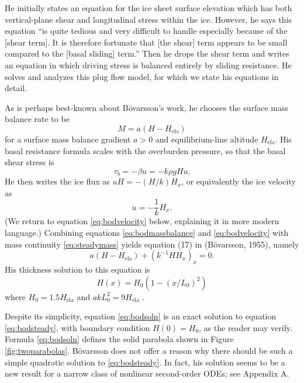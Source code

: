 \documentclass[twocolumn]{igs}
\renewcommand{\dh}{\fontencoding{T1}\selectfont{\symbol{240}}}
\newcommand{\bod}{B\"o\dh varsson\xspace}
\newcommand{\citepbod}{(B\"o\dh varsson, 1955)\nocite{Bodvardsson}\xspace}
\newcommand{\Hela}{H_{\text{ela}}}
\begin{document}
He initially states an equation for the ice sheet surface elevation which has both vertical-plane shear and longitudinal stress within the ice.  However, he says this equation ``is quite tedious and very difficult to handle especially because of the [shear term].  It is therefore fortunate that [the shear] term appears to be small compared to the [basal sliding] term.''  Then he drops the shear term and writes an equation in which driving stress is balanced entirely by sliding resistance.  He solves and analyzes this plug flow model, for which we state his equations in detail.

As is perhaps best-known about \bod's work, he chooses the surface mass balance rate to be
\begin{equation}
M = a (H - \Hela)  \label{eq:bodmassbalance}
\end{equation}
for a surface mass balance gradient $a>0$ and equilibrium-line altitude $\Hela$.  His basal resistance formula scales with the overburden pressure, so that the basal shear stress is
\begin{equation}
\tau_b = - \beta u = - k \rho g H u.  \label{eq:bodstresschoice}
\end{equation}
He then writes the ice flux as $uH=-(H/k) H_x$, or equivalently the ice velocity as
\begin{equation}
u = - \frac{1}{k} H_x. \label{eq:bodvelocity}
\end{equation}
(We return to equation \eqref{eq:bodvelocity} below, explaining it in more modern language.)  Combining equations \eqref{eq:bodmassbalance} and \eqref{eq:bodvelocity} with mass continuity \eqref{eq:steadymass} yields equation (17) in \citepbod, namely
\begin{equation}
a (H - \Hela) + (k^{-1} H H_x)_x = 0.  \label{eq:bodsteady}
\end{equation}
His thickness solution to this equation is \citep[equations (18) and (23)]{Bodvardsson}
\begin{equation}
H(x) = H_0 (1 - (x/L_0)^2)  \label{eq:bodsoln}
\end{equation}
where $H_0 = 1.5 \Hela$ and $a k L_0^2 = 9 \Hela$ \citep[equation (24)]{Bodvardsson}.

Despite its simplicity, equation \eqref{eq:bodsoln} is an exact solution to equation \eqref{eq:bodsteady}, with boundary condition $H(0)=H_0$, as the reader may verify.  Formula \eqref{eq:bodsoln} defines the solid parabola shown in Figure \ref{fig:twoparabolas}.  \bod does not offer a reason why there should be such a simple quadratic solution to \eqref{eq:bodsteady}.  In fact, his solution seems to be a new result for a narrow class of nonlinear second-order ODEs; see Appendix A.
\end{document}
